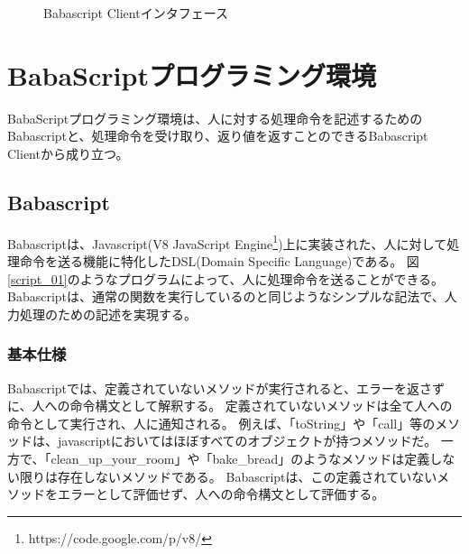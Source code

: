 \documentclass[twoside]{wiss}
\begin{document}
\begin{figure}[!h]  
  \centering
  \caption{Babascript Clientインタフェース}
  \label{webapp-interface}
\end{figure}

\section{BabaScriptプログラミング環境}
BabaScriptプログラミング環境は、人に対する処理命令を記述するためのBabascriptと、処理命令を受け取り、返り値を返すことのできるBabascript Clientから成り立つ。  

\subsection{Babascript}

Babascriptは、Javascript(V8 JavaScript Engine\footnote{https://code.google.com/p/v8/})上に実装された、人に対して処理命令を送る機能に特化したDSL(Domain Specific Language)である。
図\ref{script_01}のようなプログラムによって、人に処理命令を送ることができる。
Babascriptは、通常の関数を実行しているのと同じようなシンプルな記法で、人力処理のための記述を実現する。

\subsubsection{基本仕様}

Babascriptでは、定義されていないメソッドが実行されると、エラーを返さずに、人への命令構文として解釈する。
定義されていないメソッドは全て人への命令として実行され、人に通知される。
例えば、「toString」や「call」等のメソッドは、javascriptにおいてはほぼすべてのオブジェクトが持つメソッドだ。
一方で、「clean\_up\_your\_room」や「bake\_bread」のようなメソッドは定義しない限りは存在しないメソッドである。
Babascriptは、この定義されていないメソッドをエラーとして評価せず、人への命令構文として評価する。
\end{document}
